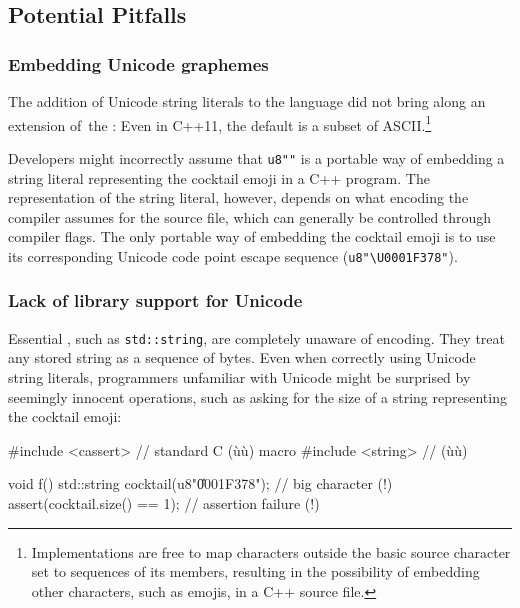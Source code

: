 \subsection[Potential Pitfalls]{Potential Pitfalls}\label{potential-pitfalls}

\subsubsection[Embedding Unicode graphemes]{Embedding Unicode graphemes}\label{embedding-unicode-graphemes}

The addition of Unicode string literals to the language did not bring
along an extension of~the : Even in C++11, the
default  is a subset of
ASCII.{\cprotect\footnote{Implementations are free to map characters
outside the basic source character set to sequences of its members,
resulting in the possibility of embedding other characters, such as emojis, in a C++ source file.}}

Developers might incorrectly assume that \lstinline!u8"!\martini\lstinline!"! is a
portable way of embedding a string literal representing the cocktail
emoji in a C++ program. The representation of the string literal, however, depends on what
encoding the compiler assumes for the source file, which can generally
be controlled through compiler flags. The only portable way of embedding
the cocktail emoji is to use its corresponding Unicode code point escape
sequence (\lstinline!u8"\U0001F378"!).

\subsubsection[Lack of library support for Unicode]{Lack of library support for Unicode}\label{lack-of-library-support-for-unicode}

Essential , such as \lstinline!std::string!, are
completely unaware of encoding. They treat any stored string as a
sequence of bytes. Even when correctly using Unicode string literals,
programmers unfamiliar with Unicode might be surprised by seemingly
innocent operations, such as asking for the size of a string
representing the cocktail emoji:

\begin{emcppslisting}
#include <cassert>  // standard C (ù{}ù) macro
#include <string>   // (ù{}ù)
                                                                                
void f()                                                                        
{                                                                               
    std::string cocktail(u8"\U0001F378"); // big character (!)                  
    assert(cocktail.size() == 1);         // assertion failure (!)              
}
\end{emcppslisting}
    
